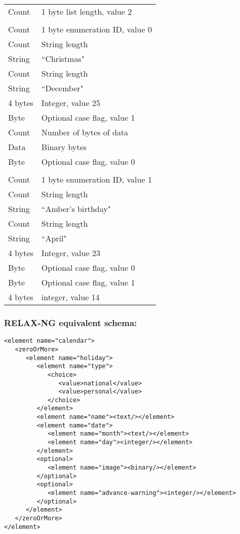 \documentclass[12pt,a4paper,twoside]{article}
\renewcommand{\_}{\texttt{\symbol{95}}}
\begin{document}
\begin{tabular}{ll}
Count & 1 byte list length, value 2\\
& \\
Count & 1 byte enumeration ID, value 0\\
Count & String length\\
String & ``Christmas"\\
Count & String length\\
String & ``December"\\
4 bytes & Integer, value 25\\
Byte & Optional case flag, value 1\\
Count & Number of bytes of data\\
Data & Binary bytes\\
Byte & Optional case flag, value 0\\
& \\
Count & 1 byte enumeration ID, value 1\\
Count & String length\\
String & ``Amber's birthday"\\
Count & String length\\
String & ``April"\\
4 bytes & Integer, value 23\\
Byte & Optional case flag, value 0\\
Byte & Optional case flag, value 1\\
4 bytes & integer, value 14\\
\end{tabular}

\subsubsection*{RELAX-NG equivalent schema:}

\begin{verbatim}
<element name="calendar">
   <zeroOrMore>
      <element name="holiday">
         <element name="type">
            <choice>
               <value>national</value>
               <value>personal</value>
            </choice>
         </element>
         <element name="name"><text/></element>
         <element name="date">
            <element name="month"><text/></element>
            <element name="day"><integer/></element>
         </element>
         <optional>
            <element name="image"><binary/></element>
         </optional>
         <optional>
            <element name="advance-warning"><integer/></element>
         </optional>
      </element>
   </zeroOrMore>
</element>
\end{verbatim}
\end{document}
